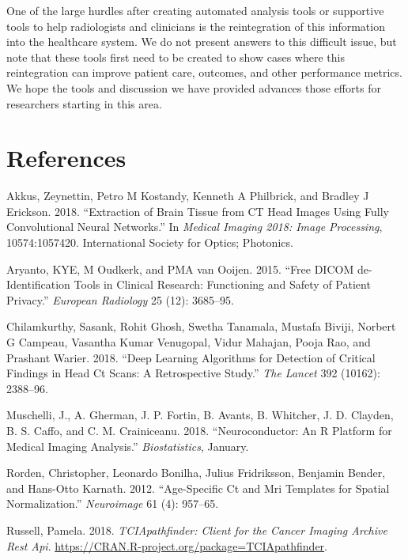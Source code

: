 \documentclass[]{elsarticle} %
\begin{document}
One of the large hurdles after creating automated analysis tools or
supportive tools to help radiologists and clinicians is the
reintegration of this information into the healthcare system. We do not
present answers to this difficult issue, but note that these tools first
need to be created to show cases where this reintegration can improve
patient care, outcomes, and other performance metrics. We hope the tools
and discussion we have provided advances those efforts for researchers
starting in this area.

\hypertarget{references}{%
\section*{References}\label{references}}

\hypertarget{refs}{}
\leavevmode\hypertarget{ref-ct_bet}{}%
Akkus, Zeynettin, Petro M Kostandy, Kenneth A Philbrick, and Bradley J
Erickson. 2018. ``Extraction of Brain Tissue from CT Head Images Using
Fully Convolutional Neural Networks.'' In \emph{Medical Imaging 2018:
Image Processing}, 10574:1057420. International Society for Optics;
Photonics.

\leavevmode\hypertarget{ref-aryanto2015free}{}%
Aryanto, KYE, M Oudkerk, and PMA van Ooijen. 2015. ``Free DICOM
de-Identification Tools in Clinical Research: Functioning and Safety of
Patient Privacy.'' \emph{European Radiology} 25 (12): 3685--95.

\leavevmode\hypertarget{ref-cq500}{}%
Chilamkurthy, Sasank, Rohit Ghosh, Swetha Tanamala, Mustafa Biviji,
Norbert G Campeau, Vasantha Kumar Venugopal, Vidur Mahajan, Pooja Rao,
and Prashant Warier. 2018. ``Deep Learning Algorithms for Detection of
Critical Findings in Head Ct Scans: A Retrospective Study.'' \emph{The
Lancet} 392 (10162): 2388--96.

\leavevmode\hypertarget{ref-neuroconductor}{}%
Muschelli, J., A. Gherman, J. P. Fortin, B. Avants, B. Whitcher, J. D.
Clayden, B. S. Caffo, and C. M. Crainiceanu. 2018. ``Neuroconductor: An
R Platform for Medical Imaging Analysis.'' \emph{Biostatistics},
January.

\leavevmode\hypertarget{ref-rorden2012age}{}%
Rorden, Christopher, Leonardo Bonilha, Julius Fridriksson, Benjamin
Bender, and Hans-Otto Karnath. 2012. ``Age-Specific Ct and Mri Templates
for Spatial Normalization.'' \emph{Neuroimage} 61 (4): 957--65.

\leavevmode\hypertarget{ref-TCIApathfinder}{}%
Russell, Pamela. 2018. \emph{TCIApathfinder: Client for the Cancer
Imaging Archive Rest Api}.
\url{https://CRAN.R-project.org/package=TCIApathfinder}.
\end{document}
